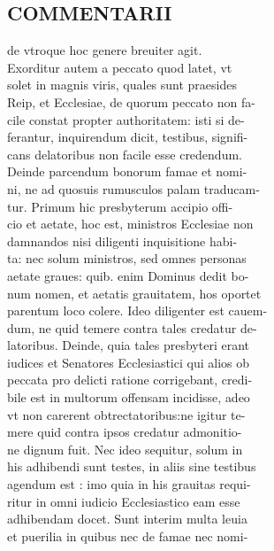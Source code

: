 \documentclass{article}
\begin{document}
\begin{pages}
\section*{COMMENTARII \\
                }de vtroque hoc genere breuiter agit. \\
                Exorditur autem a peccato quod latet, vt \\
                solet in magnis viris, quales sunt praesides \\
                Reip, et Ecclesiae, de quorum peccato non fa- \\
                cile constat propter authoritatem: isti si de- \\
                ferantur, inquirendum dicit, testibus, signifi- \\
                cans delatoribus non facile esse credendum. \\
                Deinde parcendum bonorum famae et nomi- \\
                ni, ne ad quosuis rumusculos palam traducam- \\
                tur. Primum hic presbyterum accipio offi- \\
                cio et aetate, hoc est, ministros Ecclesiae non \\
                damnandos nisi diligenti inquisitione habi- \\
                ta: nec solum ministros, sed omnes personas \\
                aetate graues: quib. enim Dominus dedit bo- \\
                num nomen, et aetatis grauitatem, hos oportet \\
                parentum loco colere. Ideo diligenter est cauem- \\
                dum, ne quid temere contra tales credatur de- \\
                latoribus. Deinde, quia tales presbyteri erant \\
                iudices et Senatores Ecclesiastici qui alios ob \\
                peccata pro delicti ratione corrigebant, credi- \\
                bile est in multorum offensam incidisse, adeo \\
                vt non carerent obtrectatoribus:ne igitur te- \\
                mere quid contra ipsos credatur admonitio- \\
                ne dignum fuit. Nec ideo sequitur, solum in \\
                his adhibendi sunt testes, in aliis sine testibus \\
                agendum est : imo quia in his grauitas requi- \\
                ritur in omni iudicio Ecclesiastico eam esse \\
                adhibendam docet. Sunt interim multa leuia \\
                et puerilia in quibus nec de famae nec nomi- \\
                

\end{pages}
\end{document}
